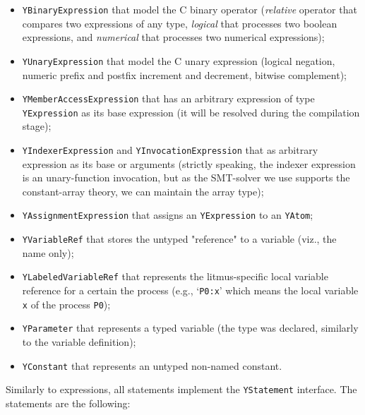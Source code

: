 \begin{itemize}%
  \item \texttt{YBinaryExpression} that model the C binary operator (\textit{relative} operator that compares two expressions of any type, \textit{logical} that processes two boolean expressions, and \textit{numerical} that processes two numerical expressions);

  \item \texttt{YUnaryExpression} that model the C unary expression (logical negation, numeric prefix and postfix increment and decrement, bitwise complement);

  \item \texttt{YMemberAccessExpression} that has an arbitrary expression of type \texttt{YExpression} as its base expression (it will be resolved during the compilation stage);%

  \item \texttt{YIndexerExpression} and \texttt{YInvocationExpression} that as arbitrary expression as its base or arguments (strictly speaking, the indexer expression is an unary-function invocation, but as the SMT-solver we use supports the constant-array theory, we can maintain the array type);

  \item \texttt{YAssignmentExpression} that assigns an \texttt{YExpression} to an \texttt{YAtom};

  \item \texttt{YVariableRef} that stores the untyped "reference" to a variable (viz., the name only);

  \item \texttt{YLabeledVariableRef} that represents the litmus-specific local variable reference for a certain the process (e.g., `\lstinline{P0:x}' which means the local variable \lstinline{x} of the process \lstinline{P0});

  \item \texttt{YParameter} that represents a typed variable (the type was declared, similarly to the variable definition);

  \item \texttt{YConstant} that represents an untyped non-named constant.
\end{itemize}

Similarly to expressions, all \ytree{} statements implement the \texttt{YStatement} interface. The statements are the following: 

